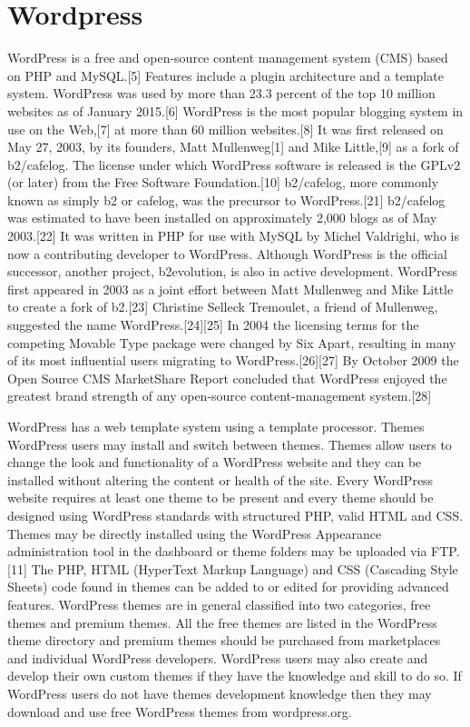 \section{Wordpress}
\label{sec:CMS_wp}

WordPress is a free and open-source content management system (CMS) based on PHP and MySQL.[5] Features include a plugin architecture and a template system. WordPress was used by more than 23.3 percent of the top 10 million websites as of January 2015.[6] WordPress is the most popular blogging system in use on the Web,[7] at more than 60 million websites.[8]
It was first released on May 27, 2003, by its founders, Matt Mullenweg[1] and Mike Little,[9] as a fork of b2/cafelog. The license under which WordPress software is released is the GPLv2 (or later) from the Free Software Foundation.[10]
b2/cafelog, more commonly known as simply b2 or cafelog, was the precursor to WordPress.[21] b2/cafelog was estimated to have been installed on approximately 2,000 blogs as of May 2003.[22] It was written in PHP for use with MySQL by Michel Valdrighi, who is now a contributing developer to WordPress. Although WordPress is the official successor, another project, b2evolution, is also in active development.
WordPress first appeared in 2003 as a joint effort between Matt Mullenweg and Mike Little to create a fork of b2.[23] Christine Selleck Tremoulet, a friend of Mullenweg, suggested the name WordPress.[24][25]
In 2004 the licensing terms for the competing Movable Type package were changed by Six Apart, resulting in many of its most influential users migrating to WordPress.[26][27] By October 2009 the Open Source CMS MarketShare Report concluded that WordPress enjoyed the greatest brand strength of any open-source content-management system.[28]


WordPress has a web template system using a template processor.
Themes 
WordPress users may install and switch between themes. Themes allow users to change the look and functionality of a WordPress website and they can be installed without altering the content or health of the site. Every WordPress website requires at least one theme to be present and every theme should be designed using WordPress standards with structured PHP, valid HTML and CSS. Themes may be directly installed using the WordPress Appearance administration tool in the dashboard or theme folders may be uploaded via FTP.[11] The PHP, HTML (HyperText Markup Language) and CSS (Cascading Style Sheets) code found in themes can be added to or edited for providing advanced features. WordPress themes are in general classified into two categories, free themes and premium themes. All the free themes are listed in the WordPress theme directory and premium themes should be purchased from marketplaces and individual WordPress developers. WordPress users may also create and develop their own custom themes if they have the knowledge and skill to do so. If WordPress users do not have themes development knowledge then they may download and use free WordPress themes from wordpress.org.

